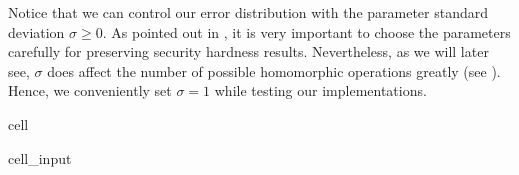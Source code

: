 \documentclass[letterpaper,10pt,english]{jupyterBook}
\begin{document}
\sphinxAtStartPar
Notice that we can control our error distribution with the parameter standard deviation \(\sigma \ge 0\).
As pointed out in {\hyperref[\detokenize{Thesis:remarks-on-security}]{}}, it is very important to choose the parameters carefully for preserving security hardness results.
Nevertheless, as we will later see, \(\sigma\) does affect the number of possible homomorphic operations greatly (see {\hyperref[\detokenize{Thesis:parameter-impact}]{}}).
Hence, we conveniently set \(\sigma = 1\) while testing our implementations.

\begin{sphinxuseclass}{cell}\begin{sphinxVerbatimInput}

\begin{sphinxuseclass}{cell_input}
\begin{sphinxVerbatim}[commandchars=\\\{\}]
   
          
      
        
        
       
     \PYG{p}{[} \PYG{p}{[} \PYG{p}{]}\PYG{p}{]}
\end{sphinxVerbatim}

\end{sphinxuseclass}\end{sphinxVerbatimInput}

\end{sphinxuseclass}
\begin{DUlineblock}{0em}
\item[] 
\end{DUlineblock}
\end{document}
